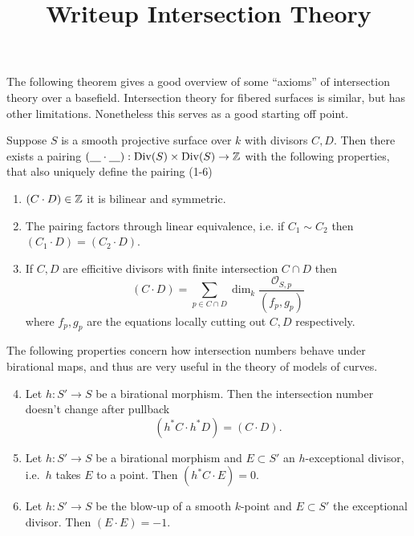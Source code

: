 \documentclass[a4paper]{article}
\title{Writeup Intersection Theory}
\begin{document}
	
\maketitle

The following theorem gives a good overview of some ``axioms'' of intersection theory over a basefield. 
Intersection theory for fibered surfaces is similar, but has other limitations. Nonetheless this serves as a good starting off point. 

\begin{theorem}
	Suppose $S$ is a smooth projective surface over $k$ with divisors $C, D$. 
	Then there exists a pairing $(\underline\quad \cdot \underline\quad): \operatorname{Div}(S) \times \operatorname{Div}(S) \to \mathbb{Z}$ with the following properties, that also uniquely define the pairing (1-6)
	\begin{enumerate}
		\item $(C \cdot  D) \in \mathbb{Z}$ it is bilinear and symmetric. 
		\item The pairing factors through linear equivalence, i.e. if $C_1 \sim C_2$ then $(C_1 \cdot D) = (C_2 \cdot  D)$. 
		\item If $C, D$ are efficitive divisors with finite intersection $C \cap D$ then \[
				(C \cdot  D) = \sum_{p \in C \cap D} \dim_k \frac{\mathcal{O}_{S, p}}{(f_p, g_p)}
		\]
		where $f_p, g_p$ are the equations locally cutting out $C, D$ respectively. 
	\end{enumerate}
	The following properties concern how intersection numbers behave under birational maps, and thus are very useful in the theory of models of curves. 
	\begin{enumerate}
		\setcounter{enumi}{3}
		\item Let $h: S' \to S$ be a birational morphism. Then the intersection number doesn't change after pullback \[
				(h^* C \cdot  h^* D) = (C\cdot D)
		.\] 
		\item Let $h: S' \to S$ be a birational morphism and $E \subset S'$ an $h$-exceptional divisor, i.e.\ $h$ takes $E$ to a point. 
			Then $(h^* C \cdot E) = 0$. 
		\item Let $h: S' \to S$ be the blow-up of a smooth $k$-point and $E \subset  S'$ the exceptional divisor. 
			Then $(E \cdot E) = - 1$. 
	\end{enumerate}
\end{theorem}

\printbibliography
\end{document}
